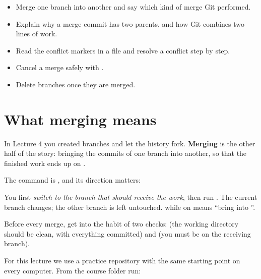 


\begin{goals}
\begin{itemize}
  \item Merge one branch into another and say which kind of merge Git performed.
  \item Explain why a merge commit has two parents, and how Git combines two lines of work.
  \item Read the conflict markers in a file and resolve a conflict step by step.
  \item Cancel a merge safely with .
  \item Delete branches once they are merged.
\end{itemize}
\end{goals}

\section{What merging means}

In Lecture 4 you created branches and let the history fork. \textbf{Merging} is the other half of the story: bringing the commits of one branch into another, so that the finished work ends up on .

The command is , and its direction matters:

\begin{keyidea}
You first \emph{switch to the branch that should receive the work}, then run . The current branch changes; the other branch is left untouched.  while on  means ``bring  into ''.
\end{keyidea}

Before every merge, get into the habit of two checks:  (the working directory should be clean, with everything committed) and  (you must be on the receiving branch).

For this lecture we use a practice repository with the same starting point on every computer. From the course folder run:

